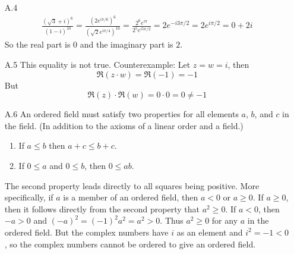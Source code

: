\documentclass[../../Solutions.tex]{subfiles}
\begin{document}
\begin{itemize}
	\item [A.4] 
		\begin{equation*} \begin{split}
			\frac{(\sqrt{3}+i)^6}{(1-i)^{10}} = \frac{(2e^{i\pi/6})^6}{(\sqrt{2}e^{i\pi/4})^{10}}
				 = \frac{2^6e^{i\pi}}{2^5e^{i5\pi/2}} = 2e^{-i3\pi/2} = 2e^{i\pi/2} = 0+2i
		\end{split} \end{equation*}
		So the real part is $0$ and the imaginary part is $2$.
		
	\item [A.5] This equality is not true.
	Counterexample: Let $z = w = i$, then
	$$ \Re(z \cdot w) = \Re(-1) = -1 $$
	But
	$$ \Re(z) \cdot \Re(w) = 0 \cdot 0 = 0 \neq -1 $$
	
	\item [A.6] An ordered field must satisfy two properties for all elements $a$, $b$, and $c$ in the field.
	(In addition to the axioms of a linear order and a field.)
	\begin{enumerate}
		\item If $a \leq b$ then $a+c \leq b+c$.
		\item If $0 \leq a$ and $0 \leq b$, then $0 \leq ab$.
	\end{enumerate}
	The second property leads directly to all squares being positive.
	More specifically, if $a$ is a member of an ordered field, then $a < 0$ or $a \geq 0$.
	If $a \geq 0$, then it follows directly from the second property that $a^2 \geq 0$.
	If $a < 0$, then $-a > 0$ and $(-a)^2 = (-1)^2a^2 = a^2 > 0$.
	Thus $a^2 \geq 0$ for any $a$ in the ordered field.
	But the complex numbers have $i$ as an element and $i^2 = -1 < 0$, so the complex numbers cannot be ordered to give an ordered field.
\end{itemize}
\end{document}
